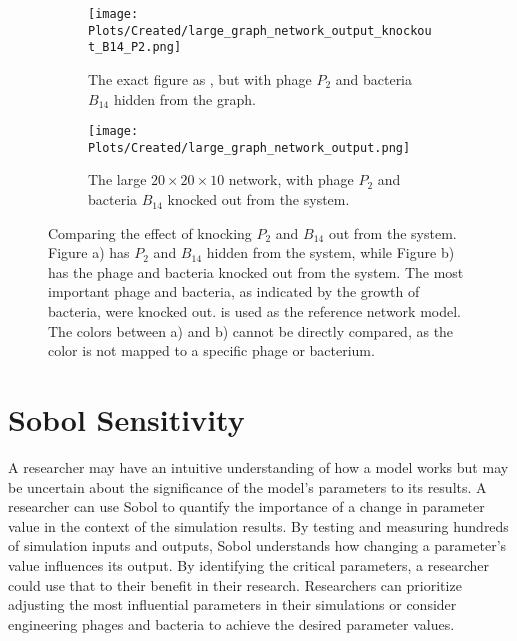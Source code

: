 \begin{figure}
    \centering
    \begin{subfigure}{0.49\linewidth}
        \centering
        \texttt{[image: Plots/Created/large\_graph\_network\_output\_knockout\_B14\_P2.png]}
        \caption{
            The exact figure as , but with phage $P_2$ and bacteria $B_{14}$ hidden from the graph. 
        }
        \label{fig:created:large_graph_network_output_hidden_B14_P2}
    \end{subfigure}
    \hfill
    \begin{subfigure}{0.49\linewidth}
        \centering
        \texttt{[image: Plots/Created/large\_graph\_network\_output.png]}
        \caption{
            The large $20\times 20\times 10$ network, with phage $P_2$ and bacteria $B_{14}$ knocked out from the system.
        }
        \label{fig:created:large_graph_network_output_knockout_B14_P2}
    \end{subfigure}
    \caption{
        Comparing the effect of knocking $P_2$ and $B_{14}$ out from the system. 
        Figure a) has $P_2$ and $B_{14}$ hidden from the system, while Figure b) has the phage and bacteria knocked out from the system. 
        The most important phage and bacteria, as indicated by the growth of bacteria, were knocked out. 
         is used as the reference network model. 
        The colors between a) and b) cannot be directly compared, as the color is not mapped to a specific phage or bacterium. 
    }
\end{figure}

\section{Sobol Sensitivity}
A researcher may have an intuitive understanding of how a model works but may be uncertain about the significance of the model's parameters to its results.  
A researcher can use Sobol to quantify the importance of a change in parameter value in the context of the simulation results. 
By testing and measuring hundreds of simulation inputs and outputs, Sobol understands how changing a parameter's value influences its output. 
By identifying the critical parameters, a researcher could use that to their benefit in their research. 
Researchers can prioritize adjusting the most influential parameters in their simulations or consider engineering phages and bacteria to achieve the desired parameter values.

